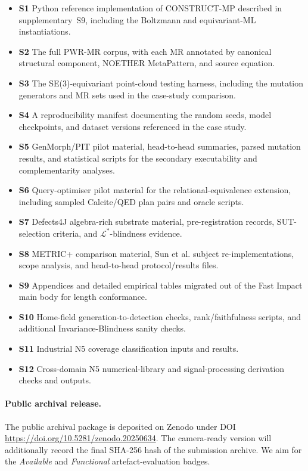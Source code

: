\documentclass[acmsmall,screen,review]{acmart}
\begin{document}
\begin{itemize}
    \item \textbf{S1} Python reference implementation of CONSTRUCT-MP described
    in supplementary~S9, including the Boltzmann and equivariant-ML
    instantiations.
    \item \textbf{S2} The full PWR-MR corpus, with each MR annotated by canonical
    structural component, NOETHER MetaPattern, and source equation.
    \item \textbf{S3} The SE(3)-equivariant point-cloud testing harness,
    including the mutation generators and MR sets used in the case-study
    comparison.
    \item \textbf{S4} A reproducibility manifest documenting the random seeds,
    model checkpoints, and dataset versions referenced in the case study.
    \item \textbf{S5} GenMorph/PIT pilot material, head-to-head summaries,
    parsed mutation results, and statistical scripts for the secondary
    executability and complementarity analyses.
    \item \textbf{S6} Query-optimiser pilot material for the
    relational-equivalence extension, including sampled Calcite/QED plan pairs
    and oracle scripts.
    \item \textbf{S7} Defects4J algebra-rich substrate material,
    pre-registration records, SUT-selection criteria, and
    $\mathcal{L}^{*}$-blindness evidence.
    \item \textbf{S8} METRIC+ comparison material, Sun et al. subject
    re-implementations, scope analysis, and head-to-head protocol/results files.
    \item \textbf{S9} Appendices and detailed empirical tables migrated out of
    the Fast Impact main body for length conformance.
    \item \textbf{S10} Home-field generation-to-detection checks,
    rank/faithfulness scripts, and additional Invariance-Blindness sanity
    checks.
    \item \textbf{S11} Industrial N5 coverage classification inputs and results.
    \item \textbf{S12} Cross-domain N5 numerical-library and signal-processing
    derivation checks and outputs.
\end{itemize}

\paragraph{Public archival release.} The public archival package is deposited on
Zenodo under DOI
\url{https://doi.org/10.5281/zenodo.20250634}. The
camera-ready version will additionally record the final SHA-256 hash of the
submission archive. We aim for the \emph{Available} and \emph{Functional}
artefact-evaluation badges.
\end{document}
